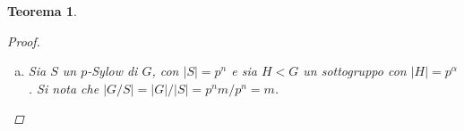 \documentclass[11pt]{scrartcl}
\theoremstyle{style1}
\newtheorem{teorema}{Teorema}[section]
\numberwithin{equation}{subsection}
\begin{document}
\begin{teorema}
\begin{proof}
\begin{enumerate}[(a).]
				Ora si considera l'azione di $G$ su $\mathcal{M} $ data da $\phi : G \to S(\mathcal{M} )$, con $\phi (g) (M)= \phi _g(M)=gM$; per il teorema delle classi:
				\[
				|\mathcal{M} | = \sum_{M_i \in R}^{} \lvert \operatorname{Orb} (M_i) \rvert = \sum_{M_i \in R}^{} \frac{\lvert G \rvert }{\lvert \operatorname{Stab} (M_i) \rvert }
				\] 
				con $R$ insieme dei rappresentanti delle orbite.
				Il fatto che $p^{n-\alpha }  \mid  \mid \lvert \mathcal{M}  \rvert $\footnote{La notazione $ \mid  \mid $ si usa per indicare divisione esatta, cio\`e nessun esponente maggiore \`e divisore.} implica che $\exists i$ tale per cui
				\[
				p^{n- \alpha  + 1}   \nmid \lvert \operatorname{Orb} (M_i) \rvert = \frac{\lvert G \rvert }{\lvert \operatorname{Stab} (M_i) \rvert }= \frac{p^n m }{\lvert \operatorname{Stab} (M_i) \rvert }
				\] 
				Ne segue anche che $p^\alpha  \mid \lvert \operatorname{Stab}(M_i)  \rvert$\footnote{Il fatto che $p^{n - \alpha }  \mid p^n m/ \lvert \operatorname{Stab} (M_i) \rvert $ implica che $p^\alpha  \mid \lvert \operatorname{Stab} (M_i) \rvert $, cosa che si vede scrivendo $p^n m / \lvert \operatorname{Stab}(M_i) \rvert = p^{n-\alpha } k$, per qualche intero $k$.}, per cui $\lvert \operatorname{Stab}(M_i)  \rvert \ge p^\alpha $; si vuole mostrare che $\lvert \operatorname{Stab} (M_i) \rvert = p^\alpha $.

				D'altra parte, la mappa $\operatorname{Stab} (M_i) \longrightarrow M_i$ tale che $\operatorname{Stab}( M_i)\ni y\longmapsto yx$, per $x \in  M_i$, \`e iniettiva perch\'e $yx = y_1 x \iff y=  y_1$, quindi $\operatorname{Stab} (M_i) \le \lvert M_i\rvert =p^\alpha $, da cui $\lvert \operatorname{Stab} (M_i) \rvert = p^\alpha $. 
				Essendo $\operatorname{Stab} (M_i) < G$, significa che in $G$ esiste un sottogruppo di ordine $p^\alpha $.
			\item Sia $S$ un $p$-Sylow di $G$, con $\lvert S \rvert = p^n$ e sia $H < G$ un sottogruppo con $\lvert H \rvert =p^\alpha $.
				Si nota che $\lvert G / S \rvert = \lvert  G \rvert / \lvert S \rvert = p^n m/ p^n = m$.


\end{enumerate}
\end{proof}
\end{teorema}
\end{document}
